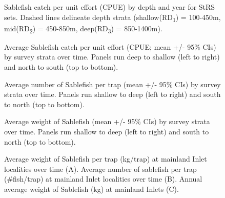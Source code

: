 \documentclass[12pt]{article}\usepackage[]{graphicx}\usepackage[]{color}
\begin{document}
\begin{figure}[htb]

{\centering {} 

}

\caption{Sablefish catch per unit effort (CPUE) by depth and year for StRS sets. Dashed lines delineate depth strata (shallow(RD\textsubscript{1}) = 100-450m, mid(RD\textsubscript{2}) = 450-850m, deep(RD\textsubscript{3}) = 850-1400m).}\label{fig:figure5}
\end{figure}
\clearpage


\begin{figure}[htb]

{\centering {} 

}

\caption{Average Sablefish catch per unit effort (CPUE; mean +/- 95\% CIs) by survey strata over time. Panels run deep to shallow (left to right) and north to south (top to bottom).}\label{fig:figure6}
\end{figure}

\begin{figure}[htb]

{\centering {} 

}

\caption{Average number of Sablefish per trap (mean +/- 95\% CIs) by survey strata over time. Panels run shallow to deep (left to right) and south to north (top to bottom).}\label{fig:figure7}
\end{figure}

\begin{figure}[htb]

{\centering {} 

}

\caption{Average weight of Sablefish (mean +/- 95\% CIs) by survey strata over time. Panels run shallow to deep (left to right) and south to north (top to bottom).}\label{fig:figure8}
\end{figure}

\begin{figure}[htb]

{\centering {} 

}

\caption{Average weight of Sablefish per trap (kg/trap) at mainland Inlet localities over time (A). Average number of sablefish per trap (\#fish/trap) at mainland Inlet localities over time (B). Annual average weight of Sablefish (kg) at mainland Inlets (C).}\label{fig:figure9}
\end{figure}
\clearpage
\end{document}
